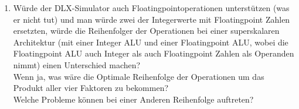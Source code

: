 \begin{enumerate}
    \item Würde der DLX-Simulator auch Floatingpointoperationen unterstützen (was er nicht tut) und man würde zwei der Integerwerte mit Floatingpoint Zahlen ersetzten, würde die Reihenfolger der Operationen bei einer superskalaren Architektur (mit einer Integer ALU und einer Floatingpoint ALU, wobei die Floatingpoint ALU auch Integer als auch Floatingpoint Zahlen als Operanden nimmt) einen Unterschied machen? \\
    Wenn ja, was wäre die Optimale Reihenfolge der Operationen um das Produkt aller vier Faktoren zu bekommen? \\
    Welche Probleme können bei einer Anderen Reihenfolge auftreten?
\end{enumerate}
